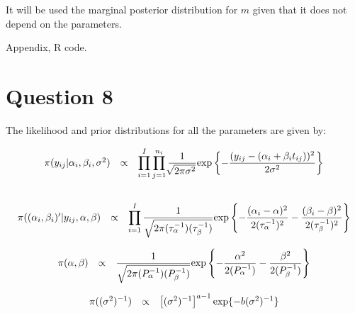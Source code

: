 \documentclass{article}
\begin{document}
It will be used the marginal posterior distribution for $m$ given that it does not depend on the parameters.

Appendix, R code.

\section{Question 8}

The likelihood and prior distributions for all the parameters are given by:

\begin{equation*}
\begin{array}{lcl ll }
\pi(y_{ij}|\alpha_i, \beta_i, \sigma^2) & \propto & \displaystyle\prod_{i=1}^{I}\displaystyle\prod_{j=1}^{n_i}\dfrac{1}{\sqrt[]{2\pi\sigma^2}}\mbox{exp}\left\{ - \dfrac{(y_{ij} - (\alpha_i + \beta_i t_{ij}))^2}{2\sigma^2}\right\} \\ \\

 \end{array}
\end{equation*}


\begin{equation*}
\begin{array}{lcl ll }
\pi((\alpha_i, \beta_i)'|y_{ij},\alpha, \beta) & \propto & \displaystyle\prod_{i=1}^{I}\dfrac{1}{\sqrt{2\pi (\tau_{\alpha}^{-1})(\tau_{\beta}^{-1})}}\mbox{exp}\left\{ - \dfrac{(\alpha_{i} - \alpha)^2}{2(\tau_{\alpha}^{-1})^2} - \dfrac{(\beta_{i} - \beta)^2}{2(\tau_{\beta}^{-1})^2}\right\}

 \end{array}
\end{equation*}


\begin{equation*}
\begin{array}{lcl ll }
\pi(\alpha, \beta) & \propto & \dfrac{1}{\sqrt{2\pi (P_{\alpha}^{-1})(P_{\beta}^{-1})}}\mbox{exp}\left\{ - \dfrac{\alpha^2}{2(P_{\alpha}^{-1})} - \dfrac{\beta^2}{2(P_{\beta}^{-1})}\right\}

 \end{array}
\end{equation*}

\begin{equation*}
\begin{array}{lcl ll }
\pi((\sigma^2)^{-1}) & \propto & \left[ (\sigma^2)^{-1} \right]^{a -1} \mbox{exp} \{ - b(\sigma^2)^{-1}\}

 \end{array}
\end{equation*}
\end{document}

